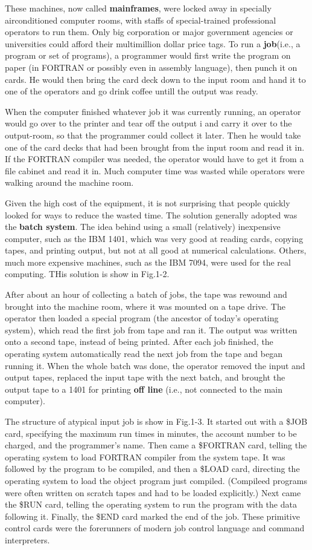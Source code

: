 \documentclass{book}
\newcommand {\kw}  [1] {\textbf{#1}}
\begin{document}
These machines, now called \kw{mainframes}, were locked away in specially airconditioned computer rooms, 
with staffs of special-trained professional operators to run them.
Only big corporation or major government agencies or universities could afford their multimillion dollar price tags.
To run a \kw{job}(i.e., a program or set of programs), a programmer would first write the program on paper 
(in FORTRAN or possibly even in assembly language), then punch it on cards.
He would then bring the card deck down to the input room and hand it to one of the operators and go drink coffee untill the output was ready.

When the computer finished whatever job it was currently running, an operator would go over to the printer and tear off the output i
and carry it over to the output-room, so that the programmer could collect it later. 
Then he would take one of the card decks that had been brought from the input room and read it in.
If the FORTRAN compiler was needed, the operator would have to get it from a file cabinet and read it in.
Much computer time was wasted while operators were walking around the machine room.

Given the high cost of the equipment, it is not surprising that people quickly looked for ways to reduce the wasted time.
The solution generally adopted was the \kw{batch system}.
The idea behind using a small (relatively) inexpensive computer, such as the IBM 1401, 
which was very good at reading cards, copying tapes, and printing output, but not at all good at numerical calculations.
Others, much more expensive machines, such as the IBM 7094, were used for the real computing.
THis solution is show in Fig.1-2.

After about an hour of collecting a batch of jobs, the tape was rewound and brought into the machine room, where it was mounted on a tape drive.
The operator then loaded a special program (the ancestor of today's operating system), which read the first job from tape and ran it.
The output was written onto a second tape, instead of being printed.
After each job finished, the operating system automatically read the next job from the tape and began running it.
When the whole batch was done, the operator removed the input and output tapes, replaced the input tape with the next batch, 
and brought the output tape to a 1401 for printing \kw{off line} (i.e., not connected to the main computer).

The structure of atypical input job is show in Fig.1-3.
It started out with a \$JOB card, specifying the maximum run times in minutes, the account number to be charged, and the programmer's name.
Then came a \$FORTRAN card, telling the operating system to load FORTRAN compiler from the system tape.
It was followed by the program to be compiled, and then a \$LOAD card, directing the operating system to load the object program just compiled.
(Compileed programs were often written on scratch tapes and had to be loaded explicitly.)
Next came the \$RUN card, telling the operating system to run the program with the data following it.
Finally, the \$END card marked the end of the job.
These primitive control cards were the forerunners of modern job control language and command interpreters.
\end{document}
